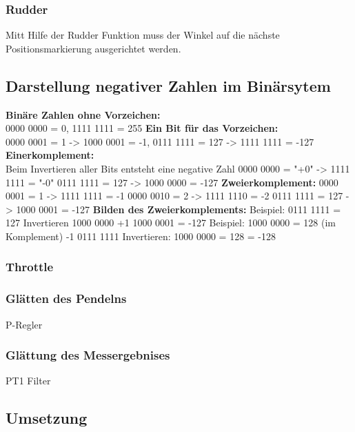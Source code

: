     \subsubsection{Rudder}

    Mitt Hilfe der Rudder Funktion muss der Winkel auf die nächste Positionsmarkierung ausgerichtet werden.


    \subsection{Darstellung negativer Zahlen im Binärsytem}

    \textbf{Binäre Zahlen ohne Vorzeichen:}\\
    0000 0000 = 0, 1111 1111 = 255
    \textbf{Ein Bit für das Vorzeichen:}\\
    0000 0001 = 1 -> 1000 0001 = -1, 
    0111 1111 = 127 -> 1111 1111 = -127
    \textbf{Einerkomplement:}\\
    Beim Invertieren aller Bits entsteht eine negative Zahl
    0000 0000 = "+0" -> 1111 1111 = "-0"
    0111 1111 = 127 -> 1000 0000 = -127
    \textbf{Zweierkomplement:}
    0000 0001 = 1 -> 1111 1111 = -1
    0000 0010 = 2 -> 1111 1110 = -2
    0111 1111 = 127 -> 1000 0001 = -127
    \textbf{Bilden des Zweierkomplements:}
    Beispiel: 0111 1111 = 127
    Invertieren
    1000 0000
    +1
    1000 0001 = -127
    Beispiel: 1000 0000 = 128 (im Komplement)
    -1
    0111 1111 Invertieren:
    1000 0000 = 128 = -128


    \subsubsection{Throttle}

    \subsubsection{Glätten des Pendelns}

    P-Regler

    \subsubsection{Glättung des Messergebnises}
    
    PT1 Filter


  \subsection{Umsetzung}

